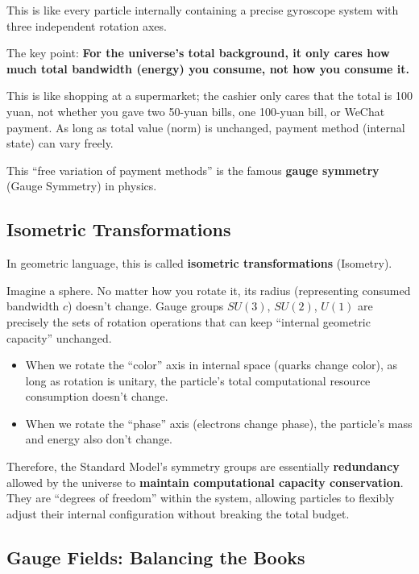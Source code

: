 This is like every particle internally containing a precise gyroscope system with three independent rotation axes.

The key point: \textbf{For the universe's total background, it only cares how much total bandwidth (energy) you consume, not how you consume it.}

This is like shopping at a supermarket; the cashier only cares that the total is 100 yuan, not whether you gave two 50-yuan bills, one 100-yuan bill, or WeChat payment. As long as total value (norm) is unchanged, payment method (internal state) can vary freely.

This ``free variation of payment methods'' is the famous \textbf{gauge symmetry} (Gauge Symmetry) in physics.

\subsection{Isometric Transformations}

In geometric language, this is called \textbf{isometric transformations} (Isometry).

Imagine a sphere. No matter how you rotate it, its radius (representing consumed bandwidth $c$) doesn't change. Gauge groups $SU(3)$, $SU(2)$, $U(1)$ are precisely the sets of rotation operations that can keep ``internal geometric capacity'' unchanged.

\begin{itemize}
\item When we rotate the ``color'' axis in internal space (quarks change color), as long as rotation is unitary, the particle's total computational resource consumption doesn't change.

\item When we rotate the ``phase'' axis (electrons change phase), the particle's mass and energy also don't change.
\end{itemize}

Therefore, the Standard Model's symmetry groups are essentially \textbf{redundancy} allowed by the universe to \textbf{maintain computational capacity conservation}. They are ``degrees of freedom'' within the system, allowing particles to flexibly adjust their internal configuration without breaking the total budget.

\subsection{Gauge Fields: Balancing the Books}

